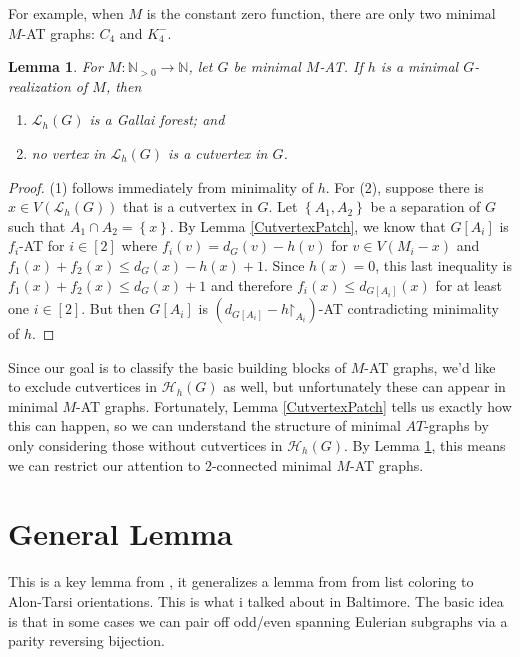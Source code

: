 \documentclass[12pt]{article}
\theoremstyle{plain}
\newtheorem{lem}[thm]{Lemma}
\theoremstyle{definition}
\theoremstyle{remark}
\newcommand{\fancy}[1]{\mathcal{#1}}
\newcommand{\IN}{\mathbb{N}}
\newcommand{\set}[1]{\left\{ #1 \right\}}
\newcommand{\func}[3]{#1\colon #2 \rightarrow #3}
\newcommand{\irange}[1]{\left[#1\right]}
\def\H{\fancy{H}}
\def\L{\fancy{L}}
\renewcommand{\restriction}{\mathord{\upharpoonright}}
\begin{document}
For example, when $M$ is the constant zero function, there are only two minimal $M$-AT graphs: $C_4$ and $K_4^-$.

\begin{lem}\label{NoLowCutvertices}
	For $\func{M}{\IN_{>0}}{\IN}$, let $G$ be minimal $M$-AT. If $h$ is a minimal $G$-realization of $M$, then
	\begin{enumerate}
		\item $\L_h(G)$ is a Gallai forest; and
		\item no vertex in $\L_h(G)$ is a cutvertex in $G$.
	\end{enumerate}
\end{lem}
\begin{proof}
	(1) follows immediately from minimality of $h$.  For (2), suppose there is $x \in V(\L_h(G))$ that is a cutvertex in $G$.  Let $\set{A_1, A_2}$ be a separation of $G$ such that $A_1 \cap A_2 = \set{x}$.  By Lemma \ref{CutvertexPatch}, we know that $G[A_i]$ is $f_i$-AT for $i \in \irange{2}$ where $f_i(v) = d_G(v) - h(v)$ for $v \in V(M_i-x)$ and $f_1(x) + f_2(x) \le d_G(x) - h(x) + 1$.  Since $h(x) = 0$, this last inequality is $f_1(x) + f_2(x) \le d_G(x) + 1$ and therefore $f_i(x) \le d_{G[A_i]}(x)$ for at least one $i \in \irange{2}$.  But then $G[A_i]$ is $(d_{G[A_i]} - h\restriction_{A_i})$-AT contradicting minimality of $h$.
\end{proof}

Since our goal is to classify the basic building blocks of $M$-AT graphs, we'd like to exclude cutvertices in $\H_h(G)$ as well, but unfortunately these can appear in minimal $M$-AT graphs.  Fortunately, Lemma \ref{CutvertexPatch} tells us exactly how this can happen, so we can understand the structure of minimal $AT$-graphs by only considering those without cutvertices in $\H_h(G)$. By Lemma \ref{NoLowCutvertices}, this means we can restrict our attention to $2$-connected minimal $M$-AT graphs.

\section{General Lemma}
This is a key lemma from \cite{OreVizing}, it generalizes a lemma from \cite{kostochkastiebitzedgesincriticalgraph} from list coloring to Alon-Tarsi orientations.  
This is what i talked about in Baltimore.  The basic idea is that in some cases we can pair off odd/even spanning Eulerian subgraphs via a parity reversing bijection.
\end{document}
